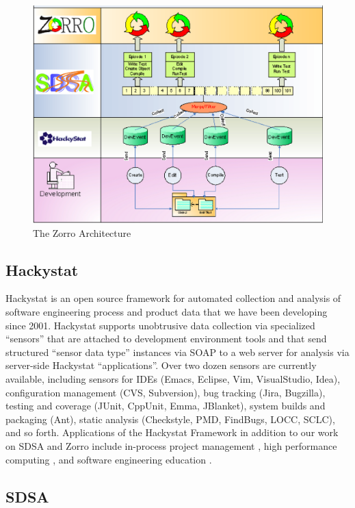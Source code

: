 \documentclass[smallextended]{svjour3}     %
\begin{document}
\begin{figure}[th]
  \center
  \includegraphics[width=1.0\textwidth]{zorro-architecture.eps}
  \caption{The Zorro Architecture}
  \label{fig:ZorroArchitecture}
\end{figure} 

\subsection{Hackystat}

Hackystat is an open source framework for automated collection and analysis
of software engineering process and product data that we have been
developing since 2001. Hackystat supports unobtrusive data collection via
specialized ``sensors'' that are attached to development environment tools
and that send structured ``sensor data type'' instances via SOAP to a web
server for analysis via server-side Hackystat ``applications''. Over two
dozen sensors are currently available, including sensors for IDEs (Emacs,
Eclipse, Vim, VisualStudio, Idea), configuration management (CVS,
Subversion), bug tracking (Jira, Bugzilla), testing and coverage (JUnit,
CppUnit, Emma, JBlanket), system builds and packaging (Ant), static
analysis (Checkstyle, PMD, FindBugs, LOCC, SCLC), and so forth.
Applications of the Hackystat Framework in addition to our work on SDSA and
Zorro include in-process project management \cite{csdl2-04-11}, high
performance computing \cite{csdl2-04-22}, and software engineering
education \cite{csdl2-03-12}.

\subsection{SDSA}
\end{document}
